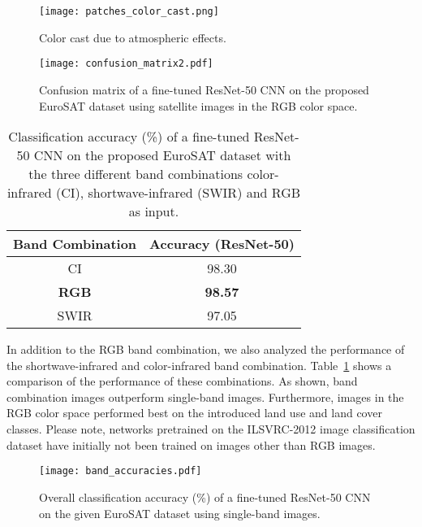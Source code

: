 \documentclass[journal]{IEEEtran}
\begin{document}
\begin{figure}[t]
	\centering
	\texttt{[image: patches\_color\_cast.png]}
	\caption{Color cast due to atmospheric effects.}
	\label{fig:patches_color_cast}
\end{figure}

\begin{figure}[t!]
	\centering
	\texttt{[image: confusion\_matrix2.pdf]}
	\caption{Confusion matrix of a fine-tuned ResNet-50 CNN on the proposed EuroSAT dataset using satellite images in the RGB color space.}
	\label{fig:confusion_matrix}
\end{figure}

\begin{table}[t!]
\centering
\vspace{+0.25cm}
\caption{Classification accuracy (\%) of a fine-tuned ResNet-50 CNN on the proposed EuroSAT dataset with the three different band combinations color-infrared (CI), shortwave-infrared (SWIR) and RGB as input.}

\begin{tabular}{|c|c|}
    \hline
    \textbf{Band Combination} & \textbf{Accuracy (ResNet-50)}\\
    \hline
    CI & 98.30\\
    \hline
    \textbf{RGB} & \textbf{98.57}\\ %
    \hline
    SWIR & 97.05\\
    \hline
\end{tabular}
\label{table:combinations_accuracies}
\end{table}

In addition to the RGB band combination, we also analyzed the performance of the shortwave-infrared and color-infrared band combination. Table~\ref{table:combinations_accuracies} shows a comparison of the performance of these combinations. As shown, band combination images outperform single-band images. Furthermore, images in the RGB color space performed best on the introduced land use and land cover classes. Please note, networks pretrained on the ILSVRC-2012 image classification dataset have initially not been trained on images other than RGB images.

\begin{figure}[t!]
	\centering
	\texttt{[image: band\_accuracies.pdf]}
	\caption{Overall classification accuracy (\%) of a fine-tuned ResNet-50 CNN on the given EuroSAT dataset using single-band images.}
	\label{fig:band_accuracies}
\end{figure}
\end{document}
